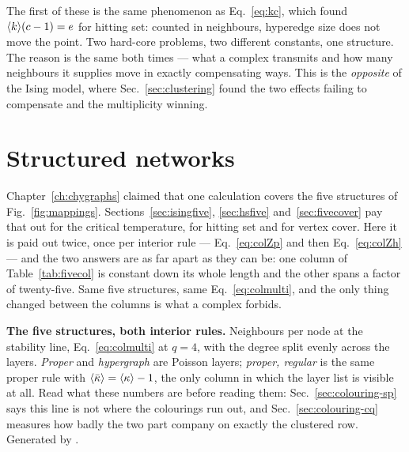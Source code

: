The first of these is the same phenomenon as Eq.~\eqref{eq:kc}, which found
$\langle k \rangle(c-1)=e$ for hitting set: counted in neighbours, hyperedge size does not
move the point. Two hard-core problems, two different constants, one structure.
The reason is the same both times --- what a complex transmits and how many
neighbours it supplies move in exactly compensating ways. This is the
\emph{opposite} of the Ising model, where Sec.~\ref{sec:clustering} found the two effects failing to compensate and
the multiplicity winning.

\section{Structured networks}
\label{sec:colfive}

Chapter~\ref{ch:chygraphs} claimed that one calculation covers the five
structures of Fig.~\ref{fig:mappings}. Sections~\ref{sec:isingfive},
\ref{sec:hsfive} and~\ref{sec:fivecover} pay that out for the critical
temperature, for hitting set and for vertex cover. Here it is paid out twice,
once per interior rule --- Eq.~\eqref{eq:colZp} and then
Eq.~\eqref{eq:colZh} --- and the two answers are as far apart as they can be:
one column of Table~\ref{tab:fivecol} is constant down its whole length and the
other spans a factor of twenty-five. Same five structures, same
Eq.~\eqref{eq:colmulti}, and the only thing changed between the columns is what
a complex forbids.

\begin{table}[t]
\centering\small
\begin{adjustbox}{max width=\linewidth}

\end{adjustbox}
\caption{\textbf{The five structures, both interior rules.} Neighbours per node
at the stability line, Eq.~\eqref{eq:colmulti} at $q=4$, with the degree split
evenly across the layers. \emph{Proper} and \emph{hypergraph} are Poisson
layers; \emph{proper, regular} is the same proper rule with
$\ave{\kbar}=\ave{\kappa}-1$, the only column in which the layer list is
visible at all. Read what these numbers are before reading them:
Sec.~\ref{sec:colouring-sp} says this line is not where the colourings run
out, and Sec.~\ref{sec:colouring-cq} measures how badly the two part company on
exactly the clustered row. Generated by
.}
\label{tab:fivecol}
\end{table}

